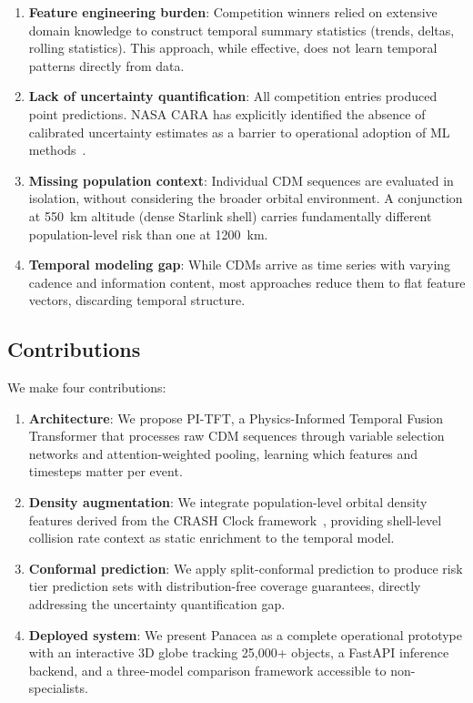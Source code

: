 \documentclass{article}
\begin{document}
\begin{enumerate}
\item \textbf{Feature engineering burden}: Competition winners relied on extensive domain knowledge to construct temporal summary statistics (trends, deltas, rolling statistics). This approach, while effective, does not learn temporal patterns directly from data.

\item \textbf{Lack of uncertainty quantification}: All competition entries produced point predictions. NASA CARA has explicitly identified the absence of calibrated uncertainty estimates as a barrier to operational adoption of ML methods~\citep{hejduk2023}.

\item \textbf{Missing population context}: Individual CDM sequences are evaluated in isolation, without considering the broader orbital environment. A conjunction at 550~km altitude (dense Starlink shell) carries fundamentally different population-level risk than one at 1200~km.

\item \textbf{Temporal modeling gap}: While CDMs arrive as time series with varying cadence and information content, most approaches reduce them to flat feature vectors, discarding temporal structure.
\end{enumerate}

\subsection{Contributions}
\label{sec:contributions}

We make four contributions:

\begin{enumerate}
\item \textbf{Architecture}: We propose PI-TFT, a Physics-Informed Temporal Fusion Transformer that processes raw CDM sequences through variable selection networks and attention-weighted pooling, learning which features and timesteps matter per event.

\item \textbf{Density augmentation}: We integrate population-level orbital density features derived from the CRASH Clock framework~\citep{thiele2025}, providing shell-level collision rate context as static enrichment to the temporal model.

\item \textbf{Conformal prediction}: We apply split-conformal prediction to produce risk tier prediction sets with distribution-free coverage guarantees, directly addressing the uncertainty quantification gap.

\item \textbf{Deployed system}: We present Panacea as a complete operational prototype with an interactive 3D globe tracking 25,000+ objects, a FastAPI inference backend, and a three-model comparison framework accessible to non-specialists.
\end{enumerate}
\end{document}
